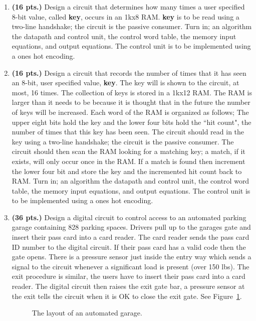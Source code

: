 \begin{enumerate}
    \item \textbf{ (16 pts.)}
        Design a circuit that determines how many times a user
        specified 8-bit value, called \textbf{ key}, occurs in an 1kx8 RAM.
        \textbf{ key} is to be read using a two-line handshake; the circuit
        is the passive consumer.
        Turn in; an algorithm the datapath and control unit, the control word
        table, the memory input equations, and output equations.
        The control unit is to be implemented using a ones hot encoding.

    \item \textbf{ (16 pts.)} Design a circuit that records the number of times that it
        has seen an 8-bit, user specified value, \textbf{ key}.  The key will
        is shown to the circuit, at most, 16 times.  The collection of
        keys is stored in a 1kx12 RAM.  The RAM is larger
        than it needs to be because it is thought that in the future
        the number of keys will be increased.  Each word of the RAM is
        organized as follows; The upper eight bits hold the key and the lower
        four bits hold the ``hit count", the number of times that this key has
        been seen.  The circuit should read in the key using a two-line
        handshake; the circuit is the passive consumer.  The circuit
        should then scan the RAM looking for a matching key; a match, if
        it exists, will only occur once in the RAM.  If a match is
        found then increment the lower four bit and store the key and the
        incremented hit count back to RAM.
        Turn in; an algorithm the datapath and control unit, the control word
        table, the memory input equations, and output equations.
        The control unit is to be implemented using a ones hot encoding.

    \item \textbf{ (36 pts.)}
        Design a digital circuit to control access to an
        automated parking garage containing 828 parking spaces.
        Drivers pull up to the garages gate and insert
        their pass card into a card reader.  The card reader sends the pass card
        ID number to the digital circuit.  If their pass card has a valid
        code then the gate opens.  There is a pressure sensor just inside the
        entry way which sends a signal to the circuit whenever a significant
        load is present (over 150 lbs).
        The exit procedure is similar, the users have to insert their pass card
        into a card reader.  The digital circuit then raises the exit gate bar,
        a pressure sensor at the exit tells the circuit when it is OK to close
        the exit gate.  See Figure~\ref{fig:Garage}.
        \begin{figure}[ht]
            \caption{The layout of an automated garage.}
            \label{fig:Garage}
        \end{figure}


\end{enumerate}
